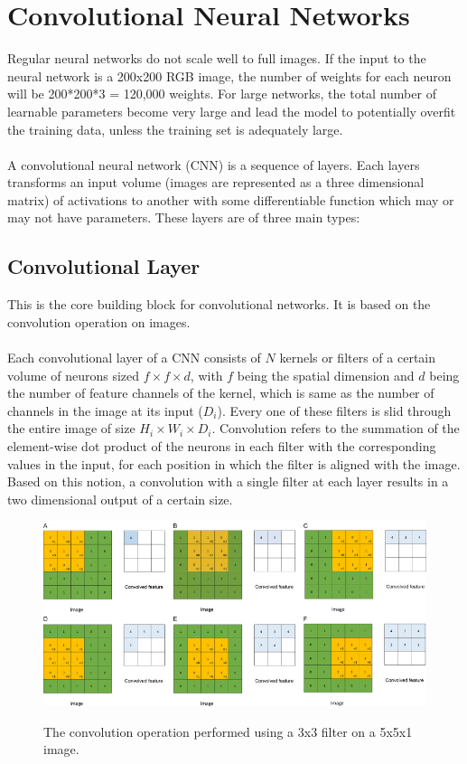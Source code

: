 \documentclass[12pt, a4paper]{report}
\begin{document}
\section{Convolutional Neural Networks}
Regular neural networks do not scale well to full images. If the input to the neural network is a 200x200 RGB image, the number of weights for each neuron will be 200*200*3 = 120,000 weights. For large networks, the total number of learnable parameters become very large and lead the model to potentially overfit the training data, unless the training set is adequately large.
\paragraph{}
A convolutional neural network (CNN) is a sequence of layers. Each layers transforms an input volume (images are represented as a three dimensional matrix) of activations to another with some differentiable function which may or may not have parameters.\cite{cs231n, dlai4} These layers are of three main types:
\subsection{Convolutional Layer}
This is the core building block for convolutional networks. It is based on the convolution operation on images.
\paragraph{}
Each convolutional layer of a CNN consists of $N$ kernels or filters of a certain volume of neurons sized $f \times f \times d$, with $f$ being the spatial dimension and $d$ being the number of feature channels of the kernel, which is same as the number of channels in the image at its input ($D_{i}$). Every one of these filters is slid through the entire image of size $H_{i} \times W_{i} \times D_{i}$. Convolution refers to the summation of the element-wise dot product of the neurons in each filter with the corresponding values in the input, for each position in which the filter is aligned with the image. Based on this notion, a convolution with a single filter at each layer results in a two dimensional output of a certain size. \cite{cs231n, muruganandham2016semantic, dlai4}
\begin{figure}[h]
\centering
\includegraphics[width=\textwidth]{cnn1.jpg}
\caption{The convolution operation performed using a 3x3 filter on a 5x5x1 image.}\cite{fathi2018deep}
\end{figure}
\end{document}
